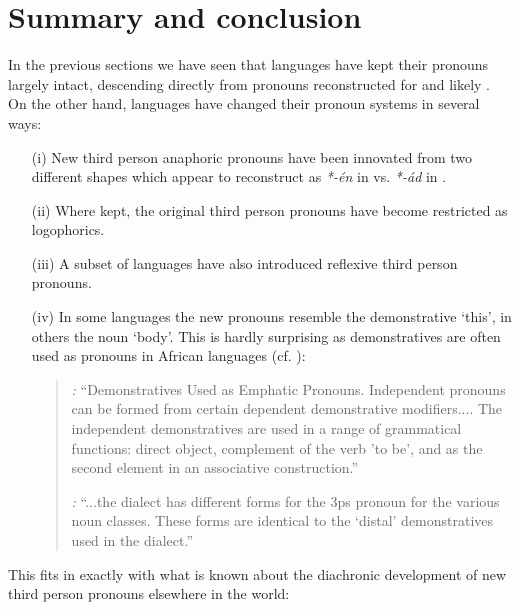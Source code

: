 \documentclass[output=paper]{langsci/langscibook}
\begin{document}
\section{Summary and conclusion}\label{sec:grassfields:7}
\largerpage
In the previous sections we have seen that  languages have kept their pronouns largely intact, descending directly from pronouns reconstructed for  and likely . On the other hand,  languages have changed their pronoun systems in several ways:

\begin{enumerate}
\item[(i)]  New third person anaphoric pronouns have been innovated from two different shapes which appear to reconstruct as \textit{*-én} in  vs. \textit{*-ád} in .

\item[(ii)]  Where kept, the original third person pronouns have become restricted as logophorics.

\item[(iii)]  A subset of  languages have also introduced reflexive third person pronouns.

\item[(iv)]  In some languages the new pronouns resemble the demonstrative ‘this’, in others the noun ‘body’. This is hardly surprising as demonstratives are often used as pronouns in African languages (cf. \citealt[215-220]{Creissels1991}):

\begin{quote}
  \textit{:} “Demonstratives Used as Emphatic Pronouns. Independent pronouns can be formed from certain dependent demonstrative modifiers.... The independent demonstratives are used in a range of grammatical functions: direct object, complement of the verb 'to be’, and as the second element in an associative construction.” \citep[146]{Parker1989}

  \textit{:} “...the  dialect has different forms for the 3ps pronoun for the various noun classes. These forms are identical to the ‘distal’ demonstratives used in the dialect.” \citep[355]{Watters1981}
\end{quote}
\end{enumerate}


\noindent
This fits in exactly with what is known about the diachronic development of new third person pronouns elsewhere in the world:
\end{document}
